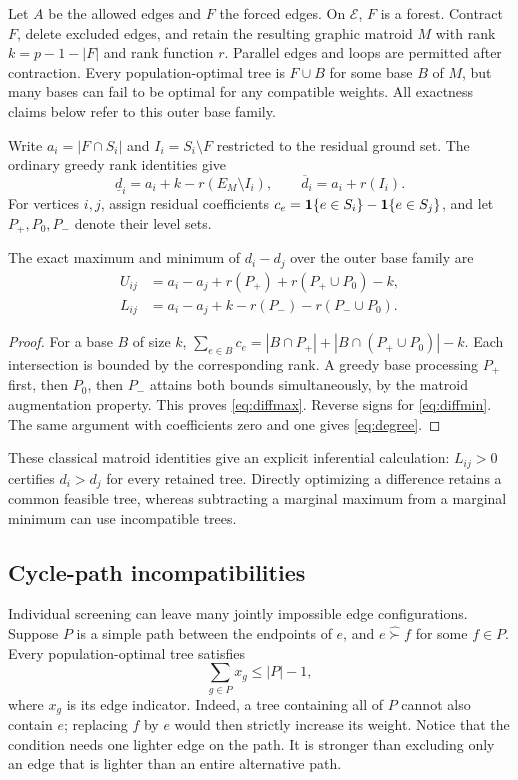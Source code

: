 \documentclass[11pt]{article}
\theoremstyle{plain}
\theoremstyle{definition}\newtheorem{remark}{Remark}\newtheorem{example}{Example}
\begin{document}
Let $A$ be the allowed edges and $F$ the forced edges. On $\mathcal E$, $F$ is a forest. Contract $F$, delete excluded edges, and retain the resulting graphic matroid $M$ with rank $k=p-1-|F|$ and rank function $r$. Parallel edges and loops are permitted after contraction. Every population-optimal tree is $F\cup B$ for some base $B$ of $M$, but many bases can fail to be optimal for any compatible weights. All exactness claims below refer to this outer base family.

Write $a_i=|F\cap S_i|$ and $I_i=S_i\setminus F$ restricted to the residual ground set. The ordinary greedy rank identities give
\begin{equation}\label{eq:degree}
 \underline d_i=a_i+k-r(E_M\setminus I_i),\qquad
 \overline d_i=a_i+r(I_i).
\end{equation}
For vertices $i,j$, assign residual coefficients $c_e=\mathbf1\{e\in S_i\}-\mathbf1\{e\in S_j\}$, and let $P_+,P_0,P_-$ denote their level sets.

\begin{proposition}\label{prop:minor}
The exact maximum and minimum of $d_i-d_j$ over the outer base family are
\begin{align}
 U_{ij}&=a_i-a_j+r(P_+)+r(P_+\cup P_0)-k,\label{eq:diffmax}\\
 L_{ij}&=a_i-a_j+k-r(P_-)-r(P_-\cup P_0).\label{eq:diffmin}
\end{align}
\end{proposition}
\begin{proof}
For a base $B$ of size $k$, $\sum_{e\in B}c_e=|B\cap P_+|+|B\cap(P_+\cup P_0)|-k$. Each intersection is bounded by the corresponding rank. A greedy base processing $P_+$ first, then $P_0$, then $P_-$ attains both bounds simultaneously, by the matroid augmentation property. This proves \eqref{eq:diffmax}. Reverse signs for \eqref{eq:diffmin}. The same argument with coefficients zero and one gives \eqref{eq:degree}.
\end{proof}

These classical matroid identities give an explicit inferential calculation: $L_{ij}>0$ certifies $d_i>d_j$ for every retained tree. Directly optimizing a difference retains a common feasible tree, whereas subtracting a marginal maximum from a marginal minimum can use incompatible trees.

\subsection{Cycle-path incompatibilities}
Individual screening can leave many jointly impossible edge configurations. Suppose $P$ is a simple path between the endpoints of $e$, and $e\widehat{\succ}f$ for some $f\in P$. Every population-optimal tree satisfies
\begin{equation}\label{eq:path}
 \sum_{g\in P}x_g\le |P|-1,
\end{equation}
where $x_g$ is its edge indicator. Indeed, a tree containing all of $P$ cannot also contain $e$; replacing $f$ by $e$ would then strictly increase its weight. Notice that the condition needs one lighter edge on the path. It is stronger than excluding only an edge that is lighter than an entire alternative path.
\end{document}
